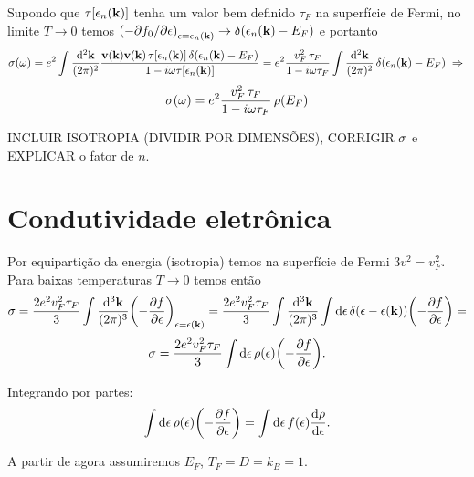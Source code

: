 \documentclass[a4paper,10pt]{article}
\begin{document}
Supondo que $\tau[\epsilon_n(\vb{k})]$ tenha um valor bem definido $\tau_F$ na superfície de Fermi, no limite $T \to 0$ temos $\qty(-\partial f_0 / \partial \epsilon)_{\epsilon = \epsilon_n(\vb{k})} \to \delta(\epsilon_n(\vb{k}) - E_F)$ e portanto
$$
\sigma(\omega) = e^2 \int \frac{\dd[2]{\vb{k}}}{(2\pi)^2}
\frac{\vb{v}(\vb{k}) \vb{v}(\vb{k}) \, \tau[\epsilon_n(\vb{k})] \, \delta(\epsilon_n(\vb{k}) - E_F)}
{1-i\omega \tau[\epsilon_n(\vb{k})]} =
e^2 \frac{v_F^2 \, \tau_F }{1-i\omega \tau_F}
\int \frac{\dd[2]{\vb{k}}}{(2\pi)^2} \, \delta(\epsilon_n(\vb{k}) - E_F) \; \Rightarrow \;
$$
$$
\sigma(\omega) = e^2 \frac{v_F^2 \, \tau_F }{1-i\omega \tau_F} \, \rho(E_F)
$$

INCLUIR ISOTROPIA (DIVIDIR POR DIMENSÕES), CORRIGIR $\sigma$ e EXPLICAR o fator de $n$.


\pagebreak

\section{Condutividade eletrônica}

Por equipartição da energia (isotropia) temos na superfície de Fermi $3v^2 = v_F^2$. Para baixas temperaturas $T \to 0$ temos então
$$
\sigma = \frac{2e^2 v_F^2 \tau_F}{3} \int \frac{\dd[3]{\vb{k}}}{(2\pi)^3}
\qty(-\pdv{f}{\epsilon})_{\epsilon=\epsilon(\vb{k})} =
\frac{2e^2 v_F^2 \tau_F}{3} \int \frac{\dd[3]{\vb{k}}}{(2\pi)^3}
\int \dd{\epsilon} \delta(\epsilon - \epsilon(\vb{k})) \qty(-\pdv{f}{\epsilon}) =
$$
$$
\sigma = \frac{2e^2 v_F^2 \tau_F}{3} \int \dd{\epsilon} \rho(\epsilon) \qty(-\pdv{f}{\epsilon}).
$$

Integrando por partes:
$$
\int \dd{\epsilon} \rho(\epsilon) \qty(-\pdv{f}{\epsilon}) =
\int \dd{\epsilon} f(\epsilon) \dv{\rho}{\epsilon}.
$$

A partir de agora assumiremos $E_F$, $T_F = D = k_B = 1$.
\end{document}
